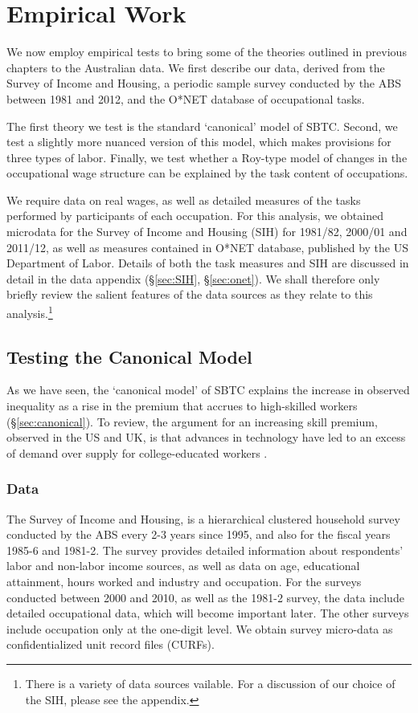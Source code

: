 \chapter{Empirical Work}\label{ch:4}

We now employ empirical tests to bring some of the theories outlined in previous chapters to the Australian data. We first describe our data, derived from the Survey of Income and Housing, a periodic sample survey conducted by the ABS between 1981 and 2012, and the O*NET database of occupational tasks.

The first theory we test is the standard `canonical' model of SBTC. Second, we test a slightly more nuanced version of this model, which makes provisions for three types of labor. Finally, we test whether a Roy-type model of changes in the occupational wage structure can be explained by the task content of occupations.

We require data on real wages, as well as detailed measures of the tasks performed by participants of each occupation. For this analysis, we obtained microdata for the Survey of Income and Housing (SIH) for 1981/82, 2000/01 and 2011/12, as well as measures contained in O*NET database, published by the US Department of Labor. Details of both the task measures and SIH are discussed in detail in the data appendix (\S\ref{sec:SIH}, \S\ref{sec:onet}). We shall therefore only briefly review the salient features of the data sources as they relate to this analysis.\footnote{There is a variety of data sources vailable. For a discussion of our choice of the SIH, please see the appendix.}

\section{Testing the Canonical Model}\label{sec:testsbtc}

As we have seen, the `canonical model' of SBTC explains the increase in observed inequality as a rise in the premium that accrues to high-skilled workers (\S\ref{sec:canonical}). To review, the argument for an increasing skill premium, observed in the US and UK, is that advances in technology have led to an excess of demand over supply for college-educated workers \citep{Katz1992}.

\subsection{Data}

The Survey of Income and Housing, is a hierarchical clustered household survey conducted by the ABS every 2-3 years since 1995, and also for the fiscal years 1985-6 and 1981-2. The survey provides detailed  information about respondents' labor and non-labor income sources, as well as data on age, educational attainment, hours worked and industry and occupation. For the surveys conducted between 2000 and 2010, as well as the 1981-2 survey, the data include detailed occupational data, which will become important later. The other surveys include occupation only at the one-digit level. We obtain survey micro-data as confidentialized unit record files (CURFs).

